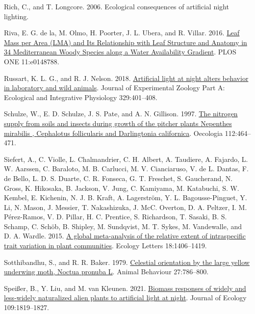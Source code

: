 \documentclass[
  12pt,
  letterpaper,
  DIV=11,
  numbers=noendperiod]{scrartcl}
\newlength{\cslhangindent}
\newlength{\cslentryspacingunit} %
\newenvironment{CSLReferences}[2] %
 {%
  \setlength{\parindent}{0pt}
  \ifodd #1
  \let\oldpar\par
  \def\par{\hangindent=\cslhangindent\oldpar}
  \fi
  \setlength{\parskip}{#2\cslentryspacingunit}
 }%
 {}
\begin{document}
\begin{CSLReferences}{1}{0}
\leavevmode{}%
Rich, C., and T. Longcore. 2006. Ecological consequences of artificial
night lighting.

\leavevmode{}%
Riva, E. G. de la, M. Olmo, H. Poorter, J. L. Ubera, and R. Villar.
2016. \href{https://doi.org/10.1371/journal.pone.0148788}{Leaf {Mass}
per {Area} ({LMA}) and {Its Relationship} with {Leaf Structure} and
{Anatomy} in 34 {Mediterranean Woody Species} along a {Water
Availability Gradient}}. PLOS ONE 11:e0148788.

\leavevmode{}%
Russart, K. L. G., and R. J. Nelson. 2018.
\href{https://doi.org/10.1002/jez.2173}{Artificial light at night alters
behavior in laboratory and wild animals}. Journal of Experimental
Zoology Part A: Ecological and Integrative Physiology 329:401--408.

\leavevmode{}%
Schulze, W., E. D. Schulze, J. S. Pate, and A. N. Gillison. 1997.
\href{https://doi.org/10.1007/s004420050333}{The nitrogen supply from
soils and insects during growth of the pitcher plants {Nepenthes}
mirabilis , {Cephalotus} follicularis and {Darlingtonia} californica}.
Oecologia 112:464--471.

\leavevmode{}%
Siefert, A., C. Violle, L. Chalmandrier, C. H. Albert, A. Taudiere, A.
Fajardo, L. W. Aarssen, C. Baraloto, M. B. Carlucci, M. V. Cianciaruso,
V. de L. Dantas, F. de Bello, L. D. S. Duarte, C. R. Fonseca, G. T.
Freschet, S. Gaucherand, N. Gross, K. Hikosaka, B. Jackson, V. Jung, C.
Kamiyama, M. Katabuchi, S. W. Kembel, E. Kichenin, N. J. B. Kraft, A.
Lagerström, Y. L. Bagousse-Pinguet, Y. Li, N. Mason, J. Messier, T.
Nakashizuka, J. McC. Overton, D. A. Peltzer, I. M. Pérez-Ramos, V. D.
Pillar, H. C. Prentice, S. Richardson, T. Sasaki, B. S. Schamp, C.
Schöb, B. Shipley, M. Sundqvist, M. T. Sykes, M. Vandewalle, and D. A.
Wardle. 2015. \href{https://doi.org/10.1111/ele.12508}{A global
meta-analysis of the relative extent of intraspecific trait variation in
plant communities}. Ecology Letters 18:1406--1419.

\leavevmode{}%
Sotthibandhu, S., and R. R. Baker. 1979.
\href{https://doi.org/10.1016/0003-3472(79)90015-0}{Celestial
orientation by the large yellow underwing moth, {Noctua} pronuba {L}}.
Animal Behaviour 27:786--800.

\leavevmode{}%
Speißer, B., Y. Liu, and M. van Kleunen. 2021.
\href{https://doi.org/10.1111/1365-2745.13607}{Biomass responses of
widely and less-widely naturalized alien plants to artificial light at
night}. Journal of Ecology 109:1819--1827.


\end{CSLReferences}
\end{document}
